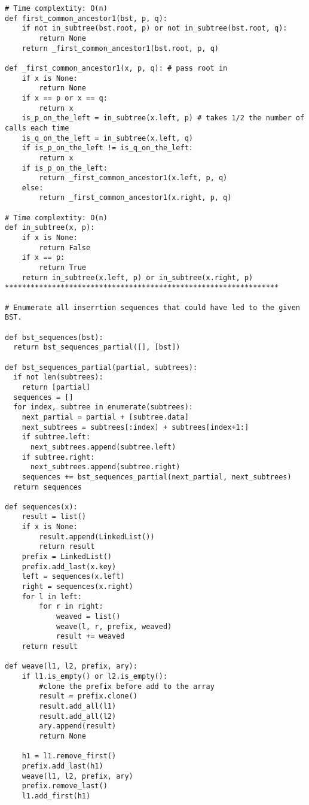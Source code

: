 \documentclass[12pt]{article}
\begin{document}
\begin{lstlisting}
# Time complextity: O(n)
def first_common_ancestor1(bst, p, q):
    if not in_subtree(bst.root, p) or not in_subtree(bst.root, q):
        return None
    return _first_common_ancestor1(bst.root, p, q)

def _first_common_ancestor1(x, p, q): # pass root in
    if x is None:
        return None
    if x == p or x == q:
        return x
    is_p_on_the_left = in_subtree(x.left, p) # takes 1/2 the number of calls each time
    is_q_on_the_left = in_subtree(x.left, q)
    if is_p_on_the_left != is_q_on_the_left:
        return x
    if is_p_on_the_left:
        return _first_common_ancestor1(x.left, p, q)
    else:
        return _first_common_ancestor1(x.right, p, q)

# Time complextity: O(n)
def in_subtree(x, p):
    if x is None:
        return False
    if x == p:
        return True
    return in_subtree(x.left, p) or in_subtree(x.right, p)
****************************************************************

# Enumerate all inserrtion sequences that could have led to the given BST.

def bst_sequences(bst):
  return bst_sequences_partial([], [bst])
  
def bst_sequences_partial(partial, subtrees):
  if not len(subtrees):
    return [partial]
  sequences = []
  for index, subtree in enumerate(subtrees):
    next_partial = partial + [subtree.data]
    next_subtrees = subtrees[:index] + subtrees[index+1:]
    if subtree.left:
      next_subtrees.append(subtree.left)
    if subtree.right:
      next_subtrees.append(subtree.right)
    sequences += bst_sequences_partial(next_partial, next_subtrees)
  return sequences

def sequences(x):
    result = list()
    if x is None:
        result.append(LinkedList())
        return result
    prefix = LinkedList()
    prefix.add_last(x.key)
    left = sequences(x.left)
    right = sequences(x.right)
    for l in left:
        for r in right:
            weaved = list()
            weave(l, r, prefix, weaved)
            result += weaved
    return result

def weave(l1, l2, prefix, ary):
    if l1.is_empty() or l2.is_empty():
        #clone the prefix before add to the array
        result = prefix.clone()
        result.add_all(l1)
        result.add_all(l2)
        ary.append(result)
        return None

    h1 = l1.remove_first()
    prefix.add_last(h1)
    weave(l1, l2, prefix, ary)
    prefix.remove_last()
    l1.add_first(h1)


\end{lstlisting}
\end{document}
